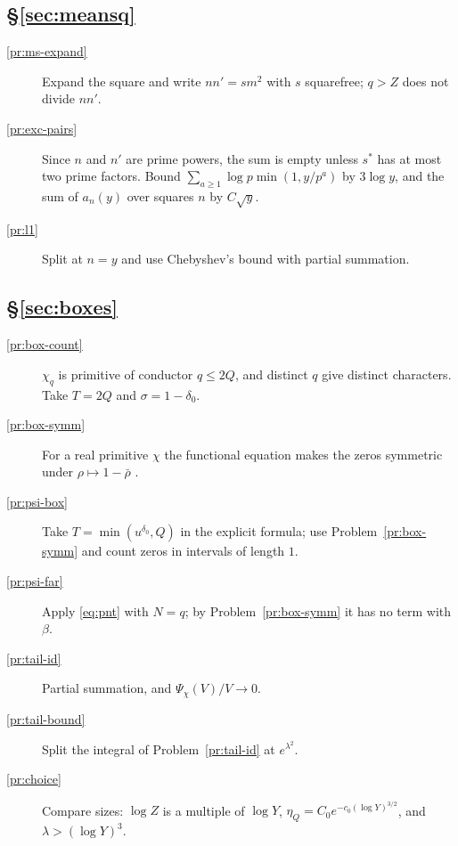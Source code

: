 \documentclass[reqno]{amsart}
\theoremstyle{definition}
\theoremstyle{plain}
\begin{document}
\subsection*{\S\ref{sec:meansq}}
\begin{description}
\item[\ref{pr:ms-expand}] Expand the square and write $n n' = s m^2$ with $s$ squarefree; $q > Z$ does not divide $n n'$.
\item[\ref{pr:exc-pairs}] Since $n$ and $n'$ are prime powers, the sum is empty unless $s^*$ has at most two prime factors.  Bound $\sum_{a \ge 1} \log p \min(1, y/p^a)$ by $3 \log y$, and the sum of $a_n(y)$ over squares $n$ by $C\sqrt y$.
\item[\ref{pr:l1}] Split at $n = y$ and use Chebyshev's bound with partial summation.
\end{description}

\subsection*{\S\ref{sec:boxes}}
\begin{description}
\item[\ref{pr:box-count}] $\chi_q$ is primitive of conductor $q \le 2Q$, and distinct $q$ give distinct characters.  Take $T = 2Q$ and $\sigma = 1 - \delta_0$.
\item[\ref{pr:box-symm}] For a real primitive $\chi$ the functional equation makes the zeros symmetric under $\rho \mapsto 1 - \bar\rho$ \cite[Ch.~9]{Dav}.
\item[\ref{pr:psi-box}] Take $T = \min(u^{\delta_0}, Q)$ in the explicit formula; use Problem~\ref{pr:box-symm} and count zeros in intervals of length $1$.
\item[\ref{pr:psi-far}] Apply \eqref{eq:pnt} with $N = q$; by Problem~\ref{pr:box-symm} it has no term with $\beta$.
\item[\ref{pr:tail-id}] Partial summation, and $\Psi_\chi(V)/V \to 0$.
\item[\ref{pr:tail-bound}] Split the integral of Problem~\ref{pr:tail-id} at $e^{\lambda^2}$.
\item[\ref{pr:choice}] Compare sizes: $\log Z$ is a multiple of $\log Y$, $\eta_Q = C_0 e^{-c_0 (\log Y)^{3/2}}$, and $\lambda > (\log Y)^3$.
\end{description}
\end{document}
